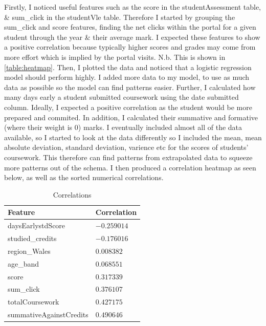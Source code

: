 \documentclass[11pt, a4paper, twocolumn]{article}
\begin{document}
Firstly, I noticed useful features such as the score in the studentAssessment table, \& sum\_click in the studentVle table.
Therefore I started by grouping the sum\_click and score features, finding the net clicks within the portal for a given student through the year \& their average mark. 
I expected these features to show a positive correlation because typically higher scores and grades may come from more effort which is implied by the portal visits. N.b. This is shown in \ref{table:heatmap}.
Then, I plotted the data and noticed that a logistic regression model should perform highly. 
I added more data to my model, to use as much data as possible so the model can find patterns easier.
Further, I calculated how many days early a student submitted coursework using the date submitted column.
Ideally, I expected a positive correlation as the student would be more prepared and commited.
In addition, I calculated their summative and formative (where their weight is 0) marks. 
I eventually included almost all of the data available, so I started to look at the data differently so I included the mean, mean absolute deviation, standard deviation, varience etc for the scores of students' coursework.
This therefore can find patterns from extrapolated data to squeeze more patterns out of the schema. 
I then produced a correlation heatmap as seen below, as well as the sorted numerical correlations.


\begin{table}[H]
	\centering
	\begin{tabular}{|l|l|}
		\hline
		Feature                    & Correlation \\ \hline
		daysEarlystdScore            & $-0.259014$ \\ \hline
		studied\_credits             & $-0.176016$ \\ \hline
		region\_Wales                & $0.008382$  \\ \hline
		age\_band                    & $0.068551$  \\ \hline
		score                        & $0.317339$  \\ \hline
		sum\_click                   & $0.376107$  \\ \hline
		totalCoursework              & $0.427175$  \\ \hline
		summativeAgainstCredits      & $0.490646$  \\ \hline
		\end{tabular}
		\caption{Correlations}
		\label{table:Correlations}
\end{table}
\end{document}

